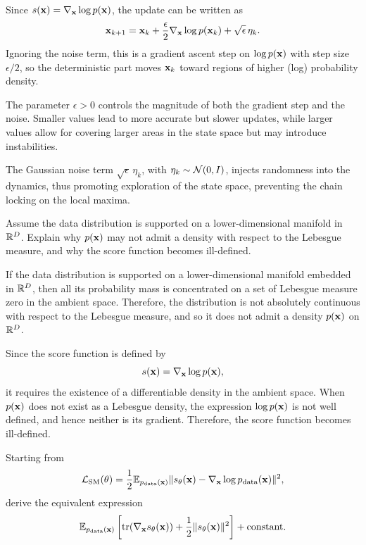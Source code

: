 \begin{solution}
Since $s({ \mathbf{x}})=\nabla_{ \mathbf{x}} \log p({ \mathbf{x}})$, the update can be written as
\[
{ \mathbf{x}}_{k+1}
=
{ \mathbf{x}}_k + \frac{\epsilon}{2}\nabla_{ \mathbf{x}} \log p({ \mathbf{x}}_k) + \sqrt{\epsilon}\,\eta_k.
\]
Ignoring the noise term, this is a gradient ascent step on $\log p({ \mathbf{x}})$ with step size $\epsilon/2$, so the deterministic part moves ${ \mathbf{x}}_k$ toward regions of higher (log) probability density.

The parameter $\epsilon>0$ controls the magnitude of both the gradient step and the noise. Smaller values lead to more accurate but slower updates, while larger values allow for covering larger areas in the state space but may introduce instabilities.

The Gaussian noise term $\sqrt{\epsilon}\,\eta_k$, with $\eta_k\sim{\mathcal N}(0,I)$, injects randomness into the dynamics, thus promoting exploration of the state space, preventing the chain locking on the local maxima.
\end{solution}


\begin{exercise}
Assume the data distribution is supported on a lower-dimensional manifold in ${\mathbb R}^D$.  
Explain why $p({ \mathbf{x}})$ may not admit a density with respect to the Lebesgue measure, and why the score function becomes ill-defined.
\end{exercise}

\begin{solution}
If the data distribution is supported on a lower-dimensional manifold embedded in ${\mathbb R}^D$, then all its probability mass is concentrated on a set of Lebesgue measure zero in the ambient space. Therefore, the distribution is not absolutely continuous with respect to the Lebesgue measure, and so it does not admit a density $p({ \mathbf{x}})$ on ${\mathbb R}^D$.

Since the score function is defined by
\[
s({ \mathbf{x}})=\nabla_{ \mathbf{x}} \log p({ \mathbf{x}}),
\]
it requires the existence of a differentiable density in the ambient space. When $p({ \mathbf{x}})$ does not exist as a Lebesgue density, the expression $\log p({ \mathbf{x}})$ is not well defined, and hence neither is its gradient. Therefore, the score function becomes ill-defined.
\end{solution}



\begin{exercise}
Starting from
\[
{\mathcal L}_{\text{SM}}(\theta) = \frac{1}{2}\mathbb{E}_{p_{\text{data}}({ \mathbf{x}})}\|s_\theta({ \mathbf{x}}) - \nabla_{ \mathbf{x}} \log p_{\text{data}}({ \mathbf{x}})\|^2,
\]
derive the equivalent expression
\[
\mathbb{E}_{p_{\text{data}}({ \mathbf{x}})}\left[\operatorname{tr}(\nabla_{ \mathbf{x}} s_\theta({ \mathbf{x}})) + \frac{1}{2}\|s_\theta({ \mathbf{x}})\|^2\right] + \text{constant}.
\]
\end{exercise}

